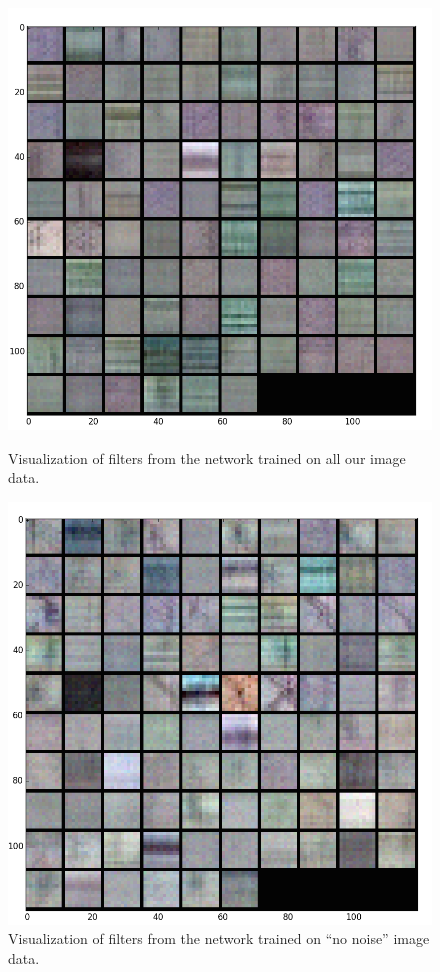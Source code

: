 \documentclass[10pt]{article}
\begin{document}
\begin{figure}[t]
\centering
  \begin{minipage}{.4\textwidth}
  \centering
  \includegraphics[width=1\linewidth]{Filters_All1000}
  \caption{Visualization of filters from the network trained on all our image data.}
  \label{fig:filters_all}
  \end{minipage}\hfill
  \begin{minipage}{.4\textwidth}
  \centering
  \includegraphics[width=1\linewidth]{Filters_NoNoise1000}
  \caption{Visualization of filters from the network trained on ``no noise'' image data.}
  \label{fig:filters_nonoise}
  \end{minipage}
\end{figure}
\end{document}
